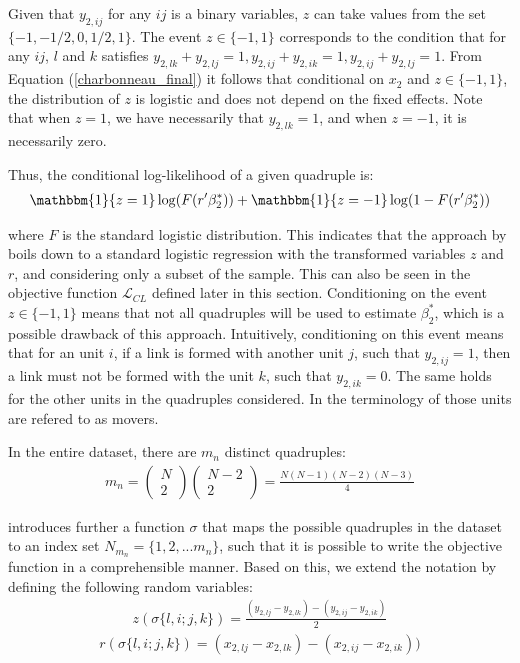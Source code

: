 Given that $y_{2,ij}$ for any $ij$ is a binary variables, $z$ can take values from the set $\{ -1, -1/2, 0, 1/2, 1\}$. The event $z \in \{-1,1\}$ corresponds to the condition that for any $ij$, $l$ and $k$ satisfies $ y_{2,lk} + y_{2,lj} = 1, y_{2,ij} + y_{2,ik} = 1, y_{2,ij} + y_{2,lj} = 1$. From Equation (\ref{charbonneau_final}) it follows that conditional on $x_2$ and $z \in \{-1,1\}$, the distribution of $z$ is logistic and does not depend on the fixed effects. Note that when $z=1$, we have necessarily that $y_{2,lk} = 1$, and when $z=-1$, it is necessarily zero.

Thus, the conditional log-likelihood of a given quadruple is:
\begin{align*}
    \mathbbm{1} \{ z = 1 \} \log (F(r'\beta_2^*)) + \mathbbm{1} \{ z = -1 \} \log (1 - F(r'\beta_2^*))
\end{align*}

\noindent where $F$ is the standard logistic distribution. This indicates that the approach by \cite{charbonneau2017multiple} boils down to a standard logistic regression with the transformed variables $z$ and $r$, and considering only a subset of the sample. This can also be seen in the objective function $\mathcal{L}_{CL}$ defined later in this section. Conditioning on the event $z \in \{-1,1\}$ means that not all quadruples will be used to estimate $\beta_2^*$, which is a possible drawback of this approach. Intuitively, conditioning on this event means that for an unit $i$, if a link is formed with another unit $j$, such that $y_{2,ij} = 1$, then a link must not be formed with the unit $k$, such that $y_{2,ik} = 0$. The same holds for the other units in the quadruples considered. In the terminology of \cite{rasch1960studies} those units are refered to as movers.

In the entire dataset, there are $m_n$ distinct quadruples:
\begin{align*}
    m_n = \begin{pmatrix}
        N \\ 2
    \end{pmatrix}
    \begin{pmatrix}
        N - 2 \\ 2
    \end{pmatrix} = \frac{N(N-1)(N-2)(N-3)}{4}
\end{align*}

\cite{jochmans2018semiparametric} introduces further a function $\sigma$ that maps the possible quadruples in the dataset to an index set $N_{m_n} = \{ 1, 2, ... m_n\}$, such that it is possible to write the objective function in a comprehensible manner. Based on this, we extend the notation by defining the following random variables:
\begin{align*}
    z(\sigma\{l,i;j,k\}) = \frac{(y_{2,lj} - y_{2,lk}) - (y_{2,ij} - y_{2,ik})}{2}
\end{align*}
\begin{align*}
    r(\sigma\{l,i;j,k\}) = (x_{2,lj} - x_{2,lk}) - (x_{2,ij} - x_{2,ik}))
\end{align*}

